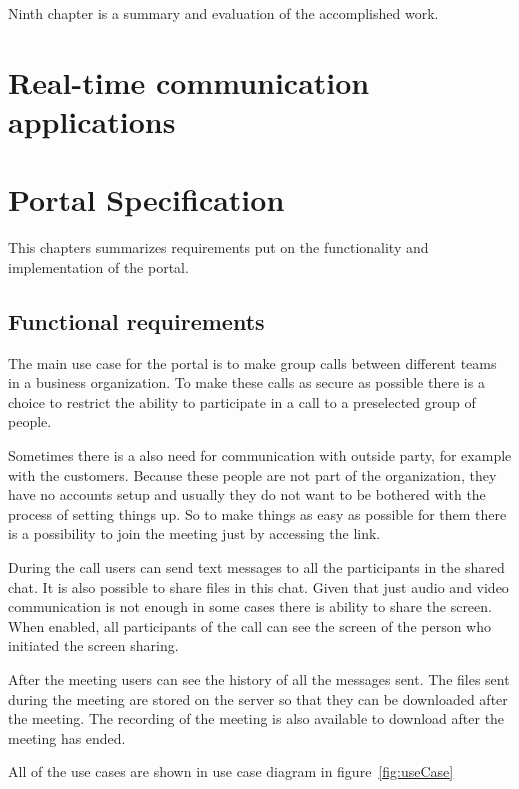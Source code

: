 \documentclass[
  digital, %
  table,   %
  lof,     %
  nolot,     %
]{fithesis3}
\begin{document}
Ninth chapter is a summary and evaluation of the accomplished work.

\chapter{Real-time communication applications}

\chapter{Portal Specification}
This chapters summarizes requirements put on the functionality and implementation of the portal.

\section{Functional requirements}
The main use case for the portal is to make group calls between different teams in a business organization. To make these calls as secure as possible there is a choice to restrict the ability to participate in a call to a preselected group of people.

Sometimes there is a also need for communication with outside party, for example with the customers. Because these people are not part of the organization, they have no accounts setup and usually they do not want to be bothered with the process of setting things up. So to make things as easy as possible for them there is a possibility to join the meeting just by accessing the link. 

During the call users can send text messages to all the participants in the shared chat. It is also possible to share files in this chat. Given that just audio and video communication is not enough in some cases there is ability to share the screen. When enabled, all participants of the call can see the screen of the person who initiated the screen sharing. 

After the meeting users can see the history of all the messages sent. The files sent during the meeting are stored on the server so that they can be downloaded after the meeting. The recording of the meeting is also available to download after the meeting has ended. 

All of the use cases are shown in use case diagram in figure~\ref{fig:useCase}
\end{document}
